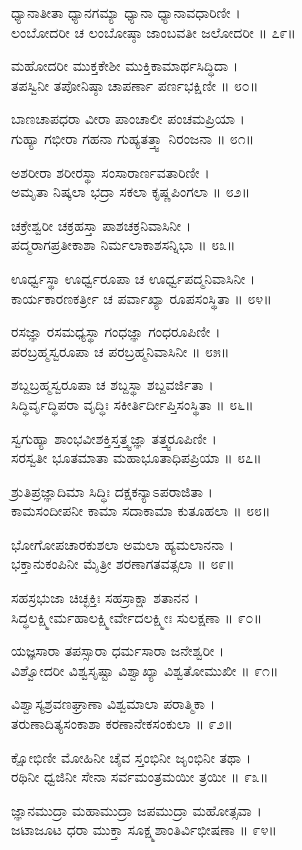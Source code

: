 ಧ್ಯಾನಾತೀತಾ ಧ್ಯಾನಗಮ್ಯಾ ಧ್ಯಾನಾ ಧ್ಯಾನಾವಧಾರಿಣೀ ।\\
ಲಂಬೋದರೀ ಚ ಲಂಬೋಷ್ಠಾ ಜಾಂಬವತೀ ಜಲೋದರೀ ॥ ೭೯॥

ಮಹೋದರೀ ಮುಕ್ತಕೇಶೀ ಮುಕ್ತಿಕಾಮಾರ್ಥಸಿದ್ಧಿದಾ ।\\
ತಪಸ್ವಿನೀ ತಪೋನಿಷ್ಠಾ ಚಾಪರ್ಣಾ ಪರ್ಣಭಕ್ಷಿಣೀ ॥ ೮೦॥

ಬಾಣಚಾಪಧರಾ ವೀರಾ ಪಾಂಚಾಲೀ ಪಂಚಮಪ್ರಿಯಾ ।\\
ಗುಹ್ಯಾ ಗಭೀರಾ ಗಹನಾ ಗುಹ್ಯತತ್ತ್ವಾ ನಿರಂಜನಾ ॥ ೮೧॥

ಅಶರೀರಾ ಶರೀರಸ್ಥಾ ಸಂಸಾರಾರ್ಣವತಾರಿಣೀ ।\\
ಅಮೃತಾ ನಿಷ್ಕಲಾ ಭದ್ರಾ ಸಕಲಾ ಕೃಷ್ಣಪಿಂಗಲಾ ॥ ೮೨॥

ಚಕ್ರೇಶ್ವರೀ ಚಕ್ರಹಸ್ತಾ ಪಾಶಚಕ್ರನಿವಾಸಿನೀ ।\\
ಪದ್ಮರಾಗಪ್ರತೀಕಾಶಾ ನಿರ್ಮಲಾಕಾಶಸನ್ನಿಭಾ ॥ ೮೩॥

ಊರ್ಧ್ವಸ್ಥಾ ಊರ್ಧ್ವರೂಪಾ ಚ ಊರ್ಧ್ವಪದ್ಮನಿವಾಸಿನೀ ।\\
ಕಾರ್ಯಕಾರಣಕರ್ತ್ರೀ ಚ ಪರ್ವಾಖ್ಯಾ ರೂಪಸಂಸ್ಥಿತಾ ॥ ೮೪॥

ರಸಜ್ಞಾ ರಸಮಧ್ಯಸ್ಥಾ ಗಂಧಜ್ಞಾ ಗಂಧರೂಪಿಣೀ ।\\
ಪರಬ್ರಹ್ಮಸ್ವರೂಪಾ ಚ ಪರಬ್ರಹ್ಮನಿವಾಸಿನೀ ॥ ೮೫॥

ಶಬ್ದಬ್ರಹ್ಮಸ್ವರೂಪಾ ಚ ಶಬ್ದಸ್ಥಾ ಶಬ್ದವರ್ಜಿತಾ ।\\
ಸಿದ್ಧಿರ್ವೃದ್ಧಿಪರಾ ವೃದ್ಧಿಃ ಸಕೀರ್ತಿರ್ದೀಪ್ತಿಸಂಸ್ಥಿತಾ ॥ ೮೬॥

ಸ್ವಗುಹ್ಯಾ ಶಾಂಭವೀಶಕ್ತಿಸ್ತತ್ತ್ವಜ್ಞಾ ತತ್ತ್ವರೂಪಿಣೀ ।\\
ಸರಸ್ವತೀ ಭೂತಮಾತಾ ಮಹಾಭೂತಾಧಿಪಪ್ರಿಯಾ ॥ ೮೭॥

ಶ್ರುತಿಪ್ರಜ್ಞಾದಿಮಾ ಸಿದ್ಧಿಃ ದಕ್ಷಕನ್ಯಾಽಪರಾಜಿತಾ ।\\
ಕಾಮಸಂದೀಪನೀ ಕಾಮಾ ಸದಾಕಾಮಾ ಕುತೂಹಲಾ ॥ ೮೮॥

ಭೋಗೋಪಚಾರಕುಶಲಾ ಅಮಲಾ ಹ್ಯಮಲಾನನಾ ।\\
ಭಕ್ತಾನುಕಂಪಿನೀ ಮೈತ್ರೀ ಶರಣಾಗತವತ್ಸಲಾ ॥ ೮೯॥

ಸಹಸ್ರಭುಜಾ ಚಿಚ್ಛಕ್ತಿಃ ಸಹಸ್ರಾಕ್ಷಾ ಶತಾನನ ।\\
ಸಿದ್ಧಲಕ್ಷ್ಮೀರ್ಮಹಾಲಕ್ಷ್ಮೀರ್ವೇದಲಕ್ಷ್ಮೀಃ ಸುಲಕ್ಷಣಾ ॥ ೯೦॥

ಯಜ್ಞಸಾರಾ ತಪಸ್ಸಾರಾ ಧರ್ಮಸಾರಾ ಜನೇಶ್ವರೀ ।\\
ವಿಶ್ವೋದರೀ ವಿಶ್ವಸೃಷ್ಟಾ ವಿಶ್ವಾಖ್ಯಾ ವಿಶ್ವತೋಮುಖೀ ॥ ೯೧॥

ವಿಶ್ವಾಸ್ಯಶ್ರವಣಘ್ರಾಣಾ ವಿಶ್ವಮಾಲಾ ಪರಾತ್ಮಿಕಾ ।\\
ತರುಣಾದಿತ್ಯಸಂಕಾಶಾ ಕರಣಾನೇಕಸಂಕುಲಾ ॥ ೯೨॥

ಕ್ಷೋಭಿಣೀ ಮೋಹಿನೀ ಚೈವ ಸ್ತಂಭಿನೀ ಜೃಂಭಿನೀ ತಥಾ ।\\
ರಥಿನೀ ಧ್ವಜಿನೀ ಸೇನಾ ಸರ್ವಮಂತ್ರಮಯೀ ತ್ರಯೀ ॥ ೯೩॥

ಜ್ಞಾನಮುದ್ರಾ ಮಹಾಮುದ್ರಾ ಜಪಮುದ್ರಾ ಮಹೋತ್ಸವಾ ।\\
ಜಟಾಜೂಟ ಧರಾ ಮುಕ್ತಾ ಸೂಕ್ಷ್ಮಶಾಂತಿರ್ವಿಭೀಷಣಾ ॥ ೯೪॥

